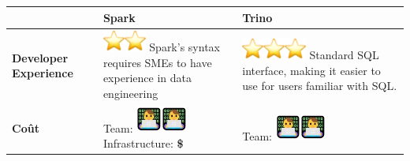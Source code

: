 \begin{longtable}{|p{0.23\linewidth}|p{0.35\linewidth}|p{0.42\linewidth}|}
\hline
\textbf{} & \textbf{Spark} & \textbf{Trino} \\ \hline
\textbf{Developer Experience} & 
\includegraphics[width=0.28in,height=0.28in]{images/image3.png}\includegraphics[width=0.28in,height=0.28in]{images/image3.png}\newline
Spark's syntax requires SMEs to have experience in data engineering &
\includegraphics[width=0.28in,height=0.28in]{images/image3.png}\includegraphics[width=0.28in,height=0.28in]{images/image3.png}\includegraphics[width=0.28in,height=0.28in]{images/image3.png}\newline
Standard SQL interface, making it easier to use for users familiar with SQL. \\ \hline
\textbf{Coût} & 
Team: \includegraphics[width=0.33in,height=0.35in]{images/image4.jpg}\includegraphics[width=0.33in,height=0.35in]{images/image4.jpg}\newline
Infrastructure: \textcolor[RGB]{0, 128, 0}{\textbf{\large \$}} & 
Team: \includegraphics[width=0.33in,height=0.35in]{images/image4.jpg}\includegraphics[width=0.33in,height=0.35in]{images/image4.jpg}\newline

\end{longtable}
